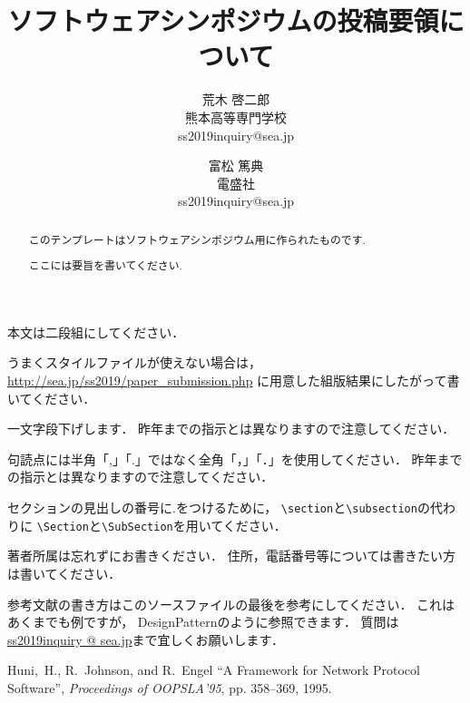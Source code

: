 \documentclass{jarticle}
\title{ソフトウェアシンポジウムの投稿要領について}
\author{荒木 啓二郎\\ 熊本高等専門学校\\
{\ttfamily ss2019inquiry@sea.jp} \and
富松 篤典\\ 電盛社\\ 
{\ttfamily ss2019inquiry@sea.jp}
}
\begin{document}
\sloppy
\maketitle


\begin{abstract}
このテンプレートはソフトウェアシンポジウム用に作られたものです.

ここには要旨を書いてください.
\end{abstract}

本文は二段組にしてください．

うまくスタイルファイルが使えない場合は，
\url{http://sea.jp/ss2019/paper_submission.php}
に用意した組版結果にしたがって書いてください．








一文字段下げします．
昨年までの指示とは異なりますので注意してください．

句読点には半角「,」「.」ではなく全角「，」「．」を使用してください．
昨年までの指示とは異なりますので注意してください．


セクションの見出しの番号に.をつけるために，
\verb|\section|と\verb|\subsection|の代わりに
\verb|\Section|と\verb|\SubSection|を用いてください．

著者所属は忘れずにお書きください．
住所，電話番号等については書きたい方は書いてください．


参考文献の書き方はこのソースファイルの最後を参考にしてください．
これはあくまでも例ですが，
DesignPattern\cite{Cond95}のように参照できます．
質問は\url{ss2019inquiry @ sea.jp}まで宜しくお願いします．

\begin{thebibliography}{9}

Huni,~H., R.~Johnson, and R.~Engel ``A Framework for Network Protocol Software'',
{\em Proceedings of OOPSLA'95}, pp. 358--369, 1995.
\end{thebibliography}
\end{document}

